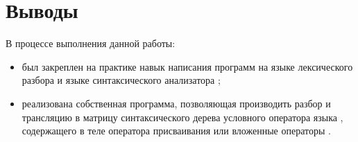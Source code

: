 \section{Выводы}

В процессе выполнения данной работы:

\begin{itemize}
	\item был закреплен на практике навык написания программ на языке лексического разбора  и языке синтаксического анализатора ;
	\item реализована собственная программа, позволяющая производить разбор и трансляцию в матрицу синтаксического дерева условного оператора  языка , содержащего в теле оператора присваивания или вложенные операторы .
\end{itemize}


